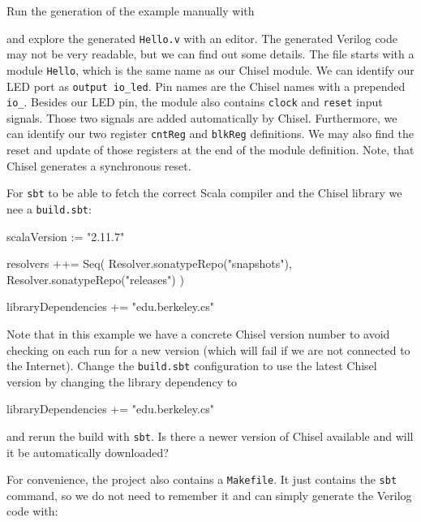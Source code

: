 \documentclass[%
    10pt, %
    headinclude, footexclude,
    openright, %
    notitlepage,
    cleardoubleempty,
    headsepline,
    pointlessnumbers,
    bibtotoc, idxtotoc,
    ]{scrbook}
\newcommand{\code}[1]{{\small{\texttt{#1}}}}
\begin{document}


\noindent Run the generation of the example manually with


and explore the generated \code{Hello.v} with an editor. The generated Verilog code may not be
very readable, but we can find out some details. The file starts with a module \code{Hello},
which is the same name as our Chisel module. We can identify our LED port as
\code{output io\_led}. Pin names are the Chisel names with a prepended \code{io\_}.
Besides our LED pin, the module also contains \code{clock} and \code{reset} input signals.
Those two signals are added automatically by Chisel.
Furthermore, we can identify our two register \code{cntReg} and \code{blkReg} definitions.
We may also find the reset and update of those registers at the end of the module definition.
Note, that Chisel generates a synchronous reset.

For \code{sbt} to be able to fetch the correct Scala compiler and the Chisel library
we nee a \code{build.sbt}:

\begin{chisel}
scalaVersion := "2.11.7"

resolvers ++= Seq(
  Resolver.sonatypeRepo("snapshots"),
  Resolver.sonatypeRepo("releases")
)

libraryDependencies += "edu.berkeley.cs" %
\end{chisel}

\noindent Note that in this example we have a concrete Chisel version number to avoid checking on
each run for a new version (which will fail if we are not connected to the Internet).
Change the \code{build.sbt} configuration to use the latest Chisel version by changing the
library dependency to

\begin{chisel}
libraryDependencies += "edu.berkeley.cs" %
\end{chisel}

\noindent and rerun the build with \code{sbt}. Is there a newer version of Chisel
available and will it be automatically downloaded?

For convenience, the project also contains a \code{Makefile}.
It just contains the \code{sbt} command, so we do not need to remember it and
can simply generate the Verilog code with:
\end{document}
